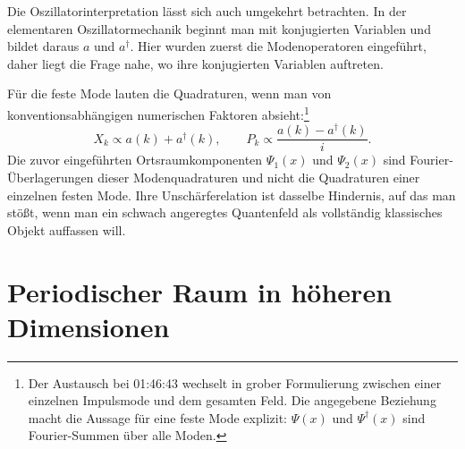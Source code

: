 Die Oszillatorinterpretation lässt sich auch umgekehrt betrachten. In der elementaren Oszillatormechanik beginnt man mit konjugierten Variablen und bildet daraus \(a\) und \(a^\dagger\). Hier wurden zuerst die Modenoperatoren eingeführt, daher liegt die Frage nahe, wo ihre konjugierten Variablen auftreten.

\begin{classroomqa}
\end{classroomqa}

Für die feste Mode lauten die Quadraturen, wenn man von konventionsabhängigen numerischen Faktoren absieht:\footnote{Der Austausch bei 01:46:43 wechselt in grober Formulierung zwischen einer einzelnen Impulsmode und dem gesamten Feld. Die angegebene Beziehung macht die Aussage für eine feste Mode explizit: \(\Psi(x)\) und \(\Psi^\dagger(x)\) sind Fourier-Summen über alle Moden.}
\begin{equation}
X_k\propto a(k)+a^\dagger(k),
\qquad
P_k\propto \frac{a(k)-a^\dagger(k)}{i}.
\end{equation}
Die zuvor eingeführten Ortsraumkomponenten \(\Psi_1(x)\) und \(\Psi_2(x)\) sind Fourier-Überlagerungen dieser Modenquadraturen und nicht die Quadraturen einer einzelnen festen Mode. Ihre Unschärferelation ist dasselbe Hindernis, auf das man stößt, wenn man ein schwach angeregtes Quantenfeld als vollständig klassisches Objekt auffassen will.

\section{Periodischer Raum in höheren Dimensionen}

\begin{classroomqa}
\end{classroomqa}

